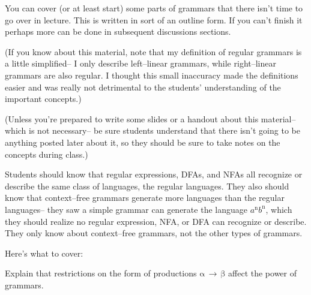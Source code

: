 \documentclass[12pt]{article}
\begin{document}
      You can cover (or at least start) some parts of grammars that there
    isn't time to go over in lecture.  This is written in sort of an outline
    form.  If you can't finish it perhaps more can be done in subsequent
    discussions sections.

      (If you know about this material, note that my definition of regular
    grammars is a little simplified-- I only describe left--linear grammars,
    while right--linear grammars are also regular.  I thought this small
    inaccuracy made the definitions easier and was really not detrimental to
    the students' understanding of the important concepts.)

      (Unless you're prepared to write some slides or a handout about this
    material-- which is not necessary-- be sure students understand that
    there isn't going to be anything posted later about it, so they should
    be sure to take notes on the concepts during class.)

      Students should know that regular expressions, DFAs, and NFAs all
    recognize or describe the same class of languages, the regular
    languages. They also should know that context--free grammars generate
    more languages than the regular languages-- they saw a simple grammar
    can generate the language $a^{\mathrm{n}}b^{\mathrm{n}}$, which they
    should realize no regular expression, NFA, or DFA can recognize or
    describe.  They only know about context--free grammars, not the other
    types of grammars.

      Here's what to cover:

      \medskip

      Explain that restrictions on the form of productions
    $\mathrm{\alpha \, \rightarrow \, \beta}$
    affect the power of grammars.

    \vspace{-3mm}
\end{document}
